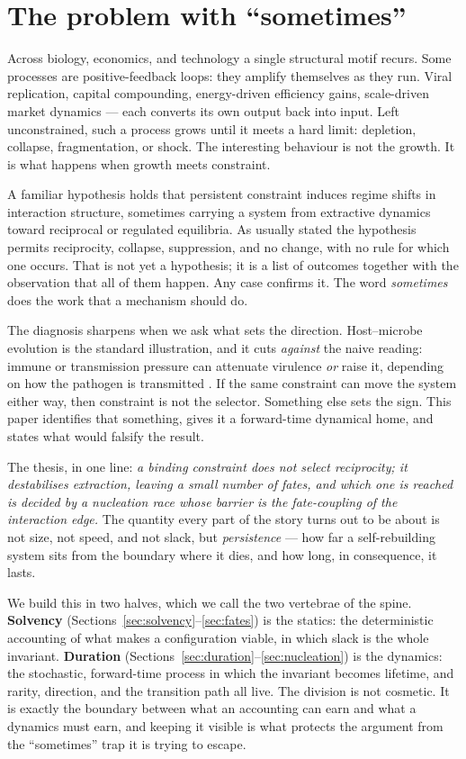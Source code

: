 \documentclass[11pt]{article}
\theoremstyle{plain}
\theoremstyle{definition}
\begin{document}
\tableofcontents

\section{The problem with ``sometimes''}

Across biology, economics, and technology a single structural motif recurs. Some processes are positive-feedback loops: they amplify themselves as they run. Viral replication, capital compounding, energy-driven efficiency gains, scale-driven market dynamics --- each converts its own output back into input. Left unconstrained, such a process grows until it meets a hard limit: depletion, collapse, fragmentation, or shock. The interesting behaviour is not the growth. It is what happens when growth meets constraint.

A familiar hypothesis holds that persistent constraint induces regime shifts in interaction structure, sometimes carrying a system from extractive dynamics toward reciprocal or regulated equilibria. As usually stated the hypothesis permits reciprocity, collapse, suppression, and no change, with no rule for which one occurs. That is not yet a hypothesis; it is a list of outcomes together with the observation that all of them happen. Any case confirms it. The word \emph{sometimes} does the work that a mechanism should do.

The diagnosis sharpens when we ask what sets the direction. Host--microbe evolution is the standard illustration, and it cuts \emph{against} the naive reading: immune or transmission pressure can attenuate virulence \emph{or} raise it, depending on how the pathogen is transmitted \cite{ewald1994,frank1996,andersonmay1991}. If the same constraint can move the system either way, then constraint is not the selector. Something else sets the sign. This paper identifies that something, gives it a forward-time dynamical home, and states what would falsify the result.

The thesis, in one line: \emph{a binding constraint does not select reciprocity; it destabilises extraction, leaving a small number of fates, and which one is reached is decided by a nucleation race whose barrier is the fate-coupling of the interaction edge.} The quantity every part of the story turns out to be about is not size, not speed, and not slack, but \emph{persistence} --- how far a self-rebuilding system sits from the boundary where it dies, and how long, in consequence, it lasts.

We build this in two halves, which we call the two vertebrae of the spine. \textbf{Solvency} (Sections~\ref{sec:solvency}--\ref{sec:fates}) is the statics: the deterministic accounting of what makes a configuration viable, in which slack is the whole invariant. \textbf{Duration} (Sections~\ref{sec:duration}--\ref{sec:nucleation}) is the dynamics: the stochastic, forward-time process in which the invariant becomes lifetime, and rarity, direction, and the transition path all live. The division is not cosmetic. It is exactly the boundary between what an accounting can earn and what a dynamics must earn, and keeping it visible is what protects the argument from the ``sometimes'' trap it is trying to escape.
\end{document}
